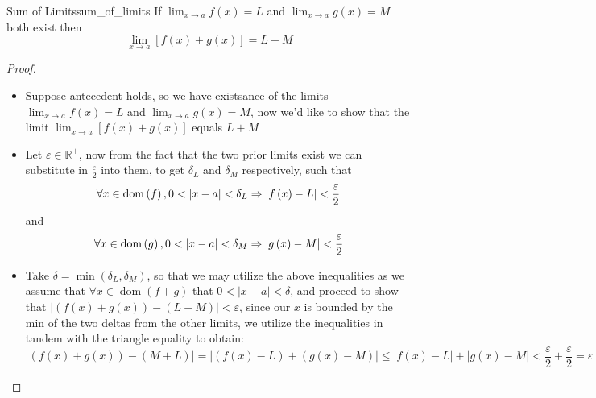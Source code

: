 \begin{proposition}{Sum of Limits}{sum_of_limits}
If $\lim _{x \rightarrow a} f(x)=L$ and $\lim _{x \rightarrow a} g(x)=M$ both exist then
$$
\lim _{x \rightarrow a}[f(x)+g(x)]=L+M
$$
\end{proposition}
\begin{proof}
    \begin{itemize}
        \item Suppose antecedent holds, so we have existsance of the limits $\lim _{x \rightarrow a} f(x)=L$ and $\lim _{x \rightarrow a} g(x)=M$, now we'd like to show that the limit $\lim _{x \rightarrow a}[f(x)+g(x)]$ equals $L+M$ 
        \item Let $ \varepsilon \in \mathbb{R} ^{ +  }$, now from the fact that the two prior limits exist we can substitute in $ \frac{\varepsilon}{2}  $ into them, to get $ \delta _{ L }  $ and $ \delta _{ M }  $ respectively, such that 
        \[
        \forall x \in  \operatorname{ dom  }\left( f \right) , 0 < \left| x -  a \right| < \delta _{ L }  \Rightarrow \left| f\left( x \right) - L \right| < \frac{\varepsilon}{2}\\
        \]
        and
        \[
        \forall x \in  \operatorname{ dom  }\left( g \right) , 0 < \left| x -  a \right| < \delta _{ M }  \Rightarrow \left| g\left( x \right) - M \right| < \frac{\varepsilon}{2}\\
        \]
        \item Take $ \delta =  \min\left( \delta _{ L }  , \delta _{ M }  \right)  $, so that we may utilize the above inequalities as we assume that $ \forall x \in  \operatorname{ dom  }\left( f +  g \right)  $ that $ 0 < \left| x -  a \right| < \delta  $, and proceed to show that $ \left| \left( f\left( x \right) +  g\left( x \right)  \right) -  \left( L +  M \right) \right| < \varepsilon  $, since our $ x $ is bounded by the min of the two deltas from the other limits, we utilize the inequalities in tandem with the triangle equality to obtain: 
        \[
        \left| \left( f\left( x \right)  +  g\left( x \right)  \right) -  \left( M +  L \right) \right| =  \left| \left( f\left( x \right) -  L \right) +  \left( g\left( x \right) -  M \right) \right| \le \left| f\left( x \right) -  L \right| + \left| g\left( x \right) -  M \right| < \frac{\varepsilon }{2} +  \frac{\varepsilon }{2} =  \varepsilon 
        \]
    \end{itemize}
\end{proof}
